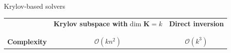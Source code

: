 \documentclass[aspectratio=169]{beamer}
\begin{document}
\begin{frame}[t, c]{Krylov-based solvers}{}
  \vfill
  \centering
  \begin{tabular}{ccc}
    ~ & \textbf{Krylov subspace with} $\textrm{dim } \bm{K} = k$ & \textbf{Direct inversion} \\ \\
    \hline \\
    \textbf{Complexity} & {\color{red} $\mathcal{O}(kn^2)$} & $\mathcal{O}(k^3)$
  \end{tabular}
  \vfill
\end{frame}


{
}
\end{document}
